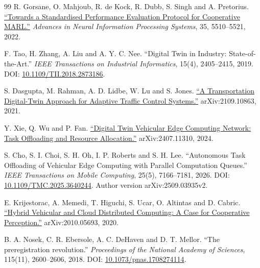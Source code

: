 \documentclass[12pt,a4paper]{article}
\begin{document}
\begin{thebibliography}{99}
 R. Gorsane, O. Mahjoub, R. de Kock, R. Dubb, S. Singh and A. Pretorius. \href{\detokenize{https://arxiv.org/abs/2209.10485}}{``Towards a Standardised Performance Evaluation Protocol for Cooperative MARL.''} \emph{Advances in Neural Information Processing Systems}, 35, 5510--5521, 2022.

 F. Tao, H. Zhang, A. Liu and A. Y. C. Nee. ``Digital Twin in Industry: State-of-the-Art.'' \emph{IEEE Transactions on Industrial Informatics}, 15(4), 2405--2415, 2019. DOI: \href{\detokenize{https://doi.org/10.1109/TII.2018.2873186}}{10.1109/TII.2018.2873186}.

 S. Dasgupta, M. Rahman, A. D. Lidbe, W. Lu and S. Jones. \href{\detokenize{https://arxiv.org/abs/2109.10863}}{``A Transportation Digital-Twin Approach for Adaptive Traffic Control Systems.''} arXiv:2109.10863, 2021.

 Y. Xie, Q. Wu and P. Fan. \href{\detokenize{https://arxiv.org/abs/2407.11310}}{``Digital Twin Vehicular Edge Computing Network: Task Offloading and Resource Allocation.''} arXiv:2407.11310, 2024.

 S. Cho, S. I. Choi, S. H. Oh, I. P. Roberts and S. H. Lee. ``Autonomous Task Offloading of Vehicular Edge Computing with Parallel Computation Queues.'' \emph{IEEE Transactions on Mobile Computing}, 25(5), 7166--7181, 2026. DOI: \href{\detokenize{https://arxiv.org/abs/2509.03935v2}}{10.1109/TMC.2025.3640244}. Author version arXiv:2509.03935v2.

 E. Krijestorac, A. Memedi, T. Higuchi, S. Ucar, O. Altintas and D. Cabric. \href{\detokenize{https://arxiv.org/abs/2010.05693}}{``Hybrid Vehicular and Cloud Distributed Computing: A Case for Cooperative Perception.''} arXiv:2010.05693, 2020.

 B. A. Nosek, C. R. Ebersole, A. C. DeHaven and D. T. Mellor. ``The preregistration revolution.'' \emph{Proceedings of the National Academy of Sciences}, 115(11), 2600--2606, 2018. DOI: \href{\detokenize{https://doi.org/10.1073/pnas.1708274114}}{10.1073/pnas.1708274114}.


\end{thebibliography}
\end{document}
